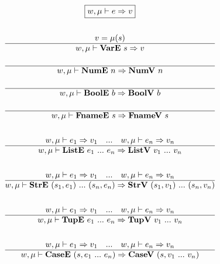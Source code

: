 
\begin{gather*}
  \boxed{w, \mu \vdash e \Rightarrow v} \\
%
\newline \\
  v = \mu(s) \\
  \hline
  w, \mu \vdash \vare ~ s \Rightarrow v \\
%
\newline \\
  \hline
  w, \mu \vdash \nume ~ n \Rightarrow \numv ~ n \\
%
\newline \\
  \hline
  w, \mu \vdash \boole ~ b \Rightarrow \boolv ~ b \\
%
\newline \\
  \hline
  w, \mu \vdash \fnamee ~ s \Rightarrow \fnamev ~ s \\
%
\newline \\
  w, \mu \vdash e_1 \Rightarrow v_1 \quad ... \quad
  w, \mu \vdash e_n \Rightarrow v_n \\
  \hline
  w, \mu \vdash \liste ~ e_1 ~ ... ~ e_n \Rightarrow \listv ~ v_1 ~ ... ~ v_n \\
%
\newline \\
  w, \mu \vdash e_1 \Rightarrow v_1 \quad ... \quad
  w, \mu \vdash e_n \Rightarrow v_n \\
  \hline
  w, \mu \vdash \stre ~ (s_1, e_1) ~ ... ~ (s_n, e_n) \Rightarrow
  \strv ~ (s_1, v_1) ~ ... ~ (s_n, v_n) \\
%
\newline \\
  w, \mu \vdash e_1 \Rightarrow v_1 \quad ... \quad
  w, \mu \vdash e_n \Rightarrow v_n \\
  \hline
  w, \mu \vdash \tupe ~ e_1 ~ ... ~ e_n \Rightarrow \tupv ~ v_1 ~ ... ~ v_n \\
%
\newline \\
  w, \mu \vdash e_1 \Rightarrow v_1 \quad ... \quad
  w, \mu \vdash e_n \Rightarrow v_n \\
  \hline
  w, \mu \vdash \casee ~ (s, e_1 ~ ... ~ e_n) \Rightarrow \casev ~ (s, v_1 ~ ... ~ v_n) \\
%
\newline \\

\end{gather*}
